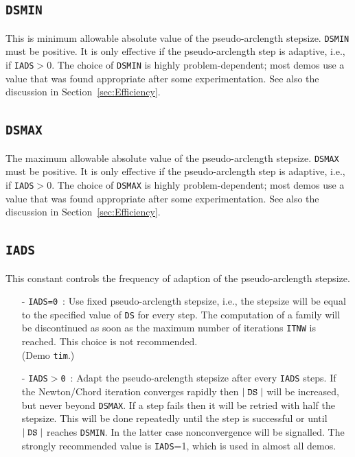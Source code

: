 \documentclass[12pt]{report}
\def\abs#1{\mid#1\mid}
\begin{document}
\subsection{\tt DSMIN}  \label{sec:DSMIN}
 This is minimum allowable absolute value of the pseudo-arclength 
 stepsize. {\tt DSMIN} must be positive.
 It is only effective if the pseudo-arclength step is adaptive,
 i.e., if {\tt IADS}$>$0.
 The choice of {\tt DSMIN} is highly problem-dependent;
 most demos use a value that was found appropriate after some
 experimentation.
 See also the discussion in Section~\ref{sec:Efficiency}.

\subsection{\tt DSMAX}  \label{sec:DSMAX}
 The maximum allowable absolute value of the pseudo-arclength stepsize.
 {\tt DSMAX} must be positive.
 It is only effective if the pseudo-arclength step is adaptive,
 i.e., if {\tt IADS}$>$0.
 The choice of {\tt DSMAX} is highly problem-dependent; 
 most demos use a value that was found appropriate after some
 experimentation.
 See also the discussion in Section~\ref{sec:Efficiency}.

\subsection{\tt IADS}  \label{sec:IADS}
This constant controls the frequency of adaption of the 
pseudo-arclength stepsize.
\begin{itemize}
\item[-] {\tt IADS=0}~: 
  Use fixed pseudo-arclength stepsize, i.e., the stepsize will
  be equal to the specified value of {\tt DS} for every step.
  The computation of a family will be discontinued as soon as
  the maximum number of iterations {\tt ITNW} is reached.
  This choice is not recommended. \\(Demo {\tt tim}.)
\item[-] {\tt IADS$>$0}~:  
 Adapt the pseudo-arclength stepsize after every {\tt IADS} steps.
  If the Newton/Chord iteration converges rapidly then 
  $\abs{\tt DS}$ will be increased, but never beyond {\tt DSMAX}.
  If a step fails then it will be retried with half
  the stepsize. This will be done repeatedly until the
  step is successful or until $\abs{\tt DS}$ reaches {\tt DSMIN}. 
  In the latter case nonconvergence will be signalled.
  The strongly recommended value is {\tt IADS}=1, which is used in 
  almost all demos.
\end{itemize}
  
\end{document}

